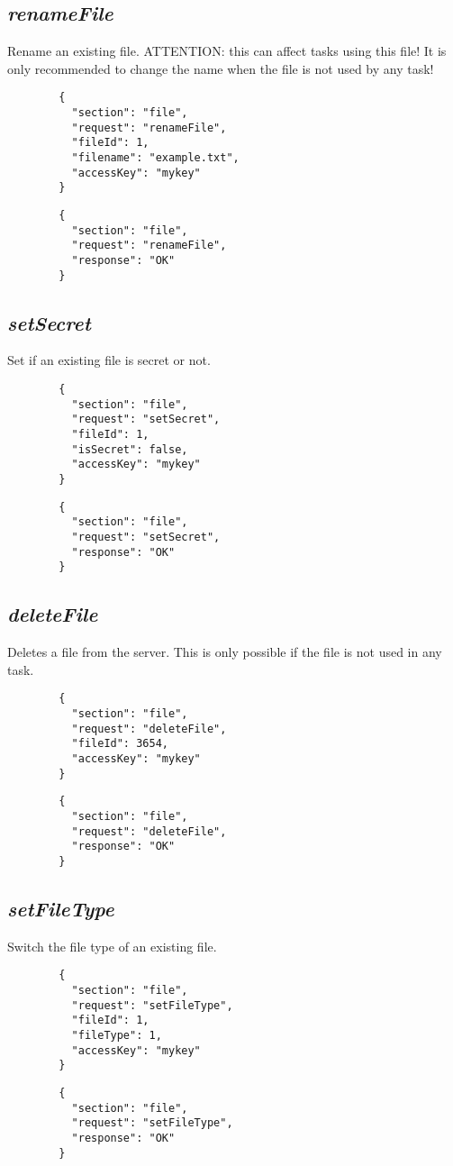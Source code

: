\subsection*{\textit{renameFile}}
	Rename an existing file. ATTENTION: this can affect tasks using this file! It is only recommended to change the name when the file is not used by any task!
	{
		\color{blue}
		\begin{verbatim}
		{
		  "section": "file",
		  "request": "renameFile",
		  "fileId": 1,
		  "filename": "example.txt",
		  "accessKey": "mykey"
		}
		\end{verbatim}
	}
	{
		\color{OliveGreen}
		\begin{verbatim}
		{
		  "section": "file",
		  "request": "renameFile",
		  "response": "OK"
		}
		\end{verbatim}
	}
\subsection*{\textit{setSecret}}
	Set if an existing file is secret or not.
	{
		\color{blue}
		\begin{verbatim}
		{
		  "section": "file",
		  "request": "setSecret",
		  "fileId": 1,
		  "isSecret": false,
		  "accessKey": "mykey"
		}
		\end{verbatim}
	}
	{
		\color{OliveGreen}
		\begin{verbatim}
		{
		  "section": "file",
		  "request": "setSecret",
		  "response": "OK"
		}
		\end{verbatim}
	}
\subsection*{\textit{deleteFile}}
	Deletes a file from the server. This is only possible if the file is not used in any task.
	{
		\color{blue}
		\begin{verbatim}
		{
		  "section": "file",
		  "request": "deleteFile",
		  "fileId": 3654,
		  "accessKey": "mykey"
		}
		\end{verbatim}
	}
	{
		\color{OliveGreen}
		\begin{verbatim}
		{
		  "section": "file",
		  "request": "deleteFile",
		  "response": "OK"
		}
		\end{verbatim}
	}
\subsection*{\textit{setFileType}}
	Switch the file type of an existing file.
	{
		\color{blue}
		\begin{verbatim}
		{
		  "section": "file",
		  "request": "setFileType",
		  "fileId": 1,
		  "fileType": 1,
		  "accessKey": "mykey"
		}
		\end{verbatim}
	}
	{
		\color{OliveGreen}
		\begin{verbatim}
		{
		  "section": "file",
		  "request": "setFileType",
		  "response": "OK"
		}
		\end{verbatim}
	}
